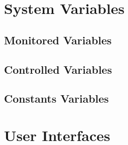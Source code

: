 \documentclass[12pt, titlepage]{article}
\begin{document}
	\section{System Variables}
	
	
	\subsection{Monitored Variables}
	
	\subsection{Controlled Variables}
	
	\subsection{Constants Variables}
	
	\section{User Interfaces}
	
\end{document}
